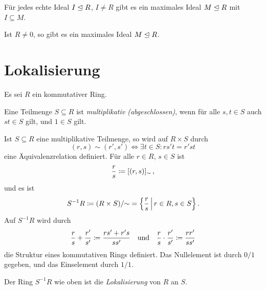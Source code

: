 \begin{lemma}
  Für jedes echte Ideal $I \mathrel{\trianglelefteq} R$, $I \neq R$ gibt es ein maximales Ideal $M \mathrel{\trianglelefteq} R$ mit $I \subseteq M$.
\end{lemma}

\begin{corollary}
  Ist $R \neq 0$, so gibt es ein maximales Ideal $M \mathrel{\trianglelefteq} R$.
\end{corollary}










\pagebreak










\section{Lokalisierung}

Es sei $R$ ein kommutativer Ring.

\begin{definition}
  Eine Teilmenge $S \subseteq R$ ist \emph{multiplikativ \textup(abgeschlossen\textup)}, wenn für alle $s, t \in S$ auch $st \in S$ gilt, und $1 \in S$ gilt.
\end{definition}

Ist $S \subseteq R$ eine multiplikative Teilmenge, so wird auf $R \times S$ durch
\begin{equation}
\label{equation: formula for localization}
        (r,s) \sim (r', s')
  \iff  \exists t \in S:
        rs't = r'st
\end{equation}
eine Äquivalenzrelation definiert.
Für alle $r \in R$, $s \in S$ ist
\[
            \frac{r}{s}
  \coloneqq  [(r,s)]_{\sim} \,,
\]
und es ist
\[
            S^{-1} R
  \defined  (R \times S)/{\sim}
  =         \left\{
              \frac{r}{s}
            \suchthat*
              r \in R,
              s \in S
            \right\}.
\]
Auf $S^{-1} R$ wird durch
\[
              \frac{r}{s}
            + \frac{r'}{s'}
  \coloneqq  \frac{rs' + r's}{ss'}
  \quad\text{und}\quad
                  \frac{r}{s}
            \cdot \frac{r'}{s'}
  \coloneqq  \frac{rr'}{ss'}
\]
die Struktur eines kommutativen Rings definiert.
Das Nullelement ist durch $0/1$ gegeben, und das Einselement durch $1/1$.

\begin{definition}
  Der Ring $S^{-1} R$ wie oben ist die \emph{Lokalisierung} von $R$ an $S$.
\end{definition}


